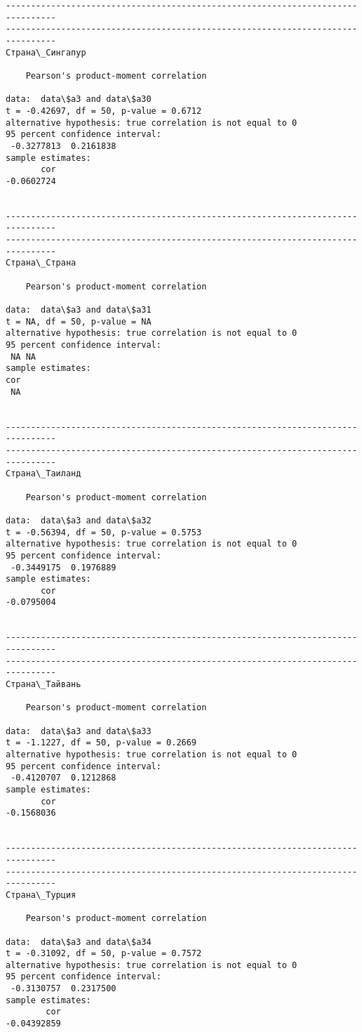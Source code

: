 \documentclass[11pt,mathletters]{article}
\begin{document}
\begin{Verbatim}[commandchars=\\\{\}]
--------------------------------------------------------------------------------
--------------------------------------------------------------------------------
Страна\_Сингапур

	Pearson's product-moment correlation

data:  data\$a3 and data\$a30
t = -0.42697, df = 50, p-value = 0.6712
alternative hypothesis: true correlation is not equal to 0
95 percent confidence interval:
 -0.3277813  0.2161838
sample estimates:
       cor 
-0.0602724 


--------------------------------------------------------------------------------
--------------------------------------------------------------------------------
Страна\_Страна

	Pearson's product-moment correlation

data:  data\$a3 and data\$a31
t = NA, df = 50, p-value = NA
alternative hypothesis: true correlation is not equal to 0
95 percent confidence interval:
 NA NA
sample estimates:
cor 
 NA 


--------------------------------------------------------------------------------
--------------------------------------------------------------------------------
Страна\_Таиланд

	Pearson's product-moment correlation

data:  data\$a3 and data\$a32
t = -0.56394, df = 50, p-value = 0.5753
alternative hypothesis: true correlation is not equal to 0
95 percent confidence interval:
 -0.3449175  0.1976889
sample estimates:
       cor 
-0.0795004 


--------------------------------------------------------------------------------
--------------------------------------------------------------------------------
Страна\_Тайвань

	Pearson's product-moment correlation

data:  data\$a3 and data\$a33
t = -1.1227, df = 50, p-value = 0.2669
alternative hypothesis: true correlation is not equal to 0
95 percent confidence interval:
 -0.4120707  0.1212868
sample estimates:
       cor 
-0.1568036 


--------------------------------------------------------------------------------
--------------------------------------------------------------------------------
Страна\_Турция

	Pearson's product-moment correlation

data:  data\$a3 and data\$a34
t = -0.31092, df = 50, p-value = 0.7572
alternative hypothesis: true correlation is not equal to 0
95 percent confidence interval:
 -0.3130757  0.2317500
sample estimates:
        cor 
-0.04392859 



\end{Verbatim}
\end{document}
